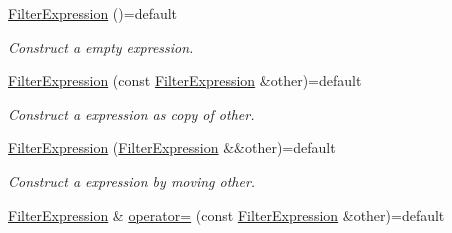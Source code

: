 \begin{DoxyCompactItemize}
\item 
\hyperlink{class_mdt_1_1_item_model_1_1_filter_expression_a991926d42a916bdd2b118d112773e4d6}{Filter\+Expression} ()=default\hypertarget{class_mdt_1_1_item_model_1_1_filter_expression_a991926d42a916bdd2b118d112773e4d6}{}\label{class_mdt_1_1_item_model_1_1_filter_expression_a991926d42a916bdd2b118d112773e4d6}

\begin{DoxyCompactList}\small\item\em Construct a empty expression. \end{DoxyCompactList}\item 
\hyperlink{class_mdt_1_1_item_model_1_1_filter_expression_a596b69598114d9247badab72ad1478fc}{Filter\+Expression} (const \hyperlink{class_mdt_1_1_item_model_1_1_filter_expression}{Filter\+Expression} \&other)=default\hypertarget{class_mdt_1_1_item_model_1_1_filter_expression_a596b69598114d9247badab72ad1478fc}{}\label{class_mdt_1_1_item_model_1_1_filter_expression_a596b69598114d9247badab72ad1478fc}

\begin{DoxyCompactList}\small\item\em Construct a expression as copy of other. \end{DoxyCompactList}\item 
\hyperlink{class_mdt_1_1_item_model_1_1_filter_expression_a8755f63fcb4cab2bc6dbc9fea895d8fb}{Filter\+Expression} (\hyperlink{class_mdt_1_1_item_model_1_1_filter_expression}{Filter\+Expression} \&\&other)=default\hypertarget{class_mdt_1_1_item_model_1_1_filter_expression_a8755f63fcb4cab2bc6dbc9fea895d8fb}{}\label{class_mdt_1_1_item_model_1_1_filter_expression_a8755f63fcb4cab2bc6dbc9fea895d8fb}

\begin{DoxyCompactList}\small\item\em Construct a expression by moving other. \end{DoxyCompactList}\item 
\hyperlink{class_mdt_1_1_item_model_1_1_filter_expression}{Filter\+Expression} \& \hyperlink{class_mdt_1_1_item_model_1_1_filter_expression_adf9287c07c7e0c1b37e54d0d644f827a}{operator=} (const \hyperlink{class_mdt_1_1_item_model_1_1_filter_expression}{Filter\+Expression} \&other)=default\hypertarget{class_mdt_1_1_item_model_1_1_filter_expression_adf9287c07c7e0c1b37e54d0d644f827a}{}\label{class_mdt_1_1_item_model_1_1_filter_expression_adf9287c07c7e0c1b37e54d0d644f827a}


\end{DoxyCompactItemize}
